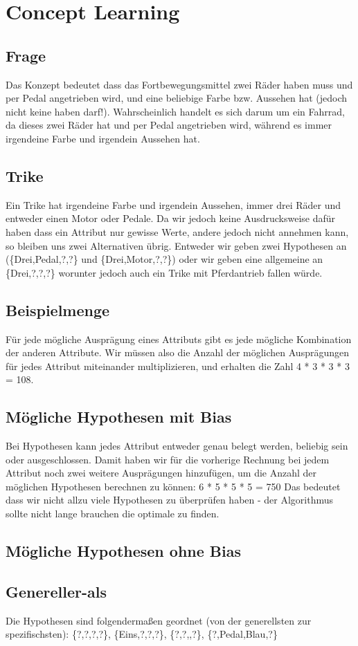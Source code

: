 \documentclass[a4paper]{article}
\begin{document}
\section{Concept Learning}
\subsection{Frage}
Das Konzept bedeutet dass das Fortbewegungsmittel zwei Räder haben muss und per Pedal angetrieben wird, und eine beliebige Farbe bzw. Aussehen hat (jedoch nicht keine haben darf!). Wahrscheinlich handelt es sich darum um ein Fahrrad, da dieses zwei Räder hat und per Pedal angetrieben wird, während es immer irgendeine Farbe und irgendein Aussehen hat.
\subsection{Trike}
Ein Trike hat irgendeine Farbe und irgendein Aussehen, immer drei Räder und entweder einen Motor oder Pedale. Da wir jedoch keine Ausdrucksweise dafür haben dass ein Attribut nur gewisse Werte, andere jedoch nicht annehmen kann, so bleiben uns zwei Alternativen übrig. Entweder wir geben zwei Hypothesen an (\{Drei,Pedal,?,?\} und \{Drei,Motor,?,?\}) oder wir geben eine allgemeine an \{Drei,?,?,?\} worunter jedoch auch ein Trike mit Pferdantrieb fallen würde.
\subsection{Beispielmenge}
Für jede mögliche Ausprägung eines Attributs gibt es jede mögliche Kombination der anderen Attribute. Wir müssen also die Anzahl der möglichen Ausprägungen für jedes Attribut miteinander multiplizieren, und erhalten die Zahl 4 * 3 * 3 * 3 = 108.
\subsection{Mögliche Hypothesen mit Bias}
Bei Hypothesen kann jedes Attribut entweder genau belegt werden, beliebig sein oder ausgeschlossen. Damit haben wir für die vorherige Rechnung bei jedem Attribut noch zwei weitere Ausprägungen hinzufügen, um die Anzahl der möglichen Hypothesen berechnen zu können: 6 * 5 * 5 * 5 = 750
Das bedeutet dass wir nicht allzu viele Hypothesen zu überprüfen haben - der Algorithmus sollte nicht lange brauchen die optimale zu finden.
\subsection{Mögliche Hypothesen ohne Bias}
\subsection{Genereller-als}
Die Hypothesen sind folgendermaßen geordnet (von der generellsten zur spezifischsten): \{?,?,?,?\}, \{Eins,?,?,?\}, \{?,?,,?\}, \{?,Pedal,Blau,?\}
\end{document}

